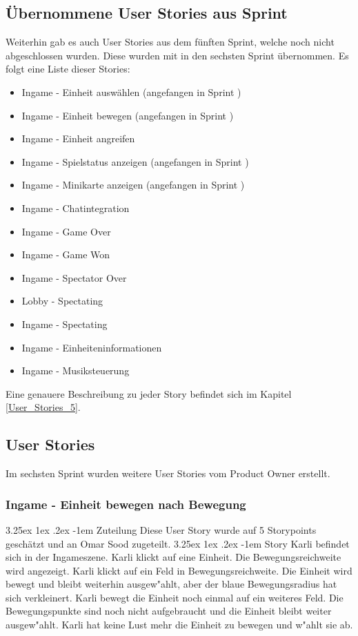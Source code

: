 \documentclass[12pt, titlepage]{scrartcl}
\makeatletter
\newcommand{\RN}[1]{%
	\textup{\uppercase\expandafter{\romannumeral#1}}%
}
\renewcommand\paragraph{\@startsection{paragraph}{5}{\z@}%
  {3.25ex \@plus1ex \@minus.2ex}%
  {-1em}%
  {\normalfont\normalsize\bfseries}}
\makeatother
\begin{document}
   		\subsection{\"Ubernommene User Stories aus Sprint \RN{5}}
   			Weiterhin gab es auch User Stories aus dem f\"unften Sprint, welche noch nicht abgeschlossen wurden. Diese wurden mit in den sechsten Sprint \"ubernommen. Es folgt eine Liste dieser Stories:
   			\begin{itemize}
   				\item Ingame - Einheit ausw\"ahlen (angefangen in Sprint \RN{5})
   				\item Ingame - Einheit bewegen (angefangen in Sprint \RN{5})
   				\item Ingame - Einheit angreifen
   				\item Ingame - Spielstatus anzeigen (angefangen in Sprint \RN{5})
   				\item Ingame - Minikarte anzeigen (angefangen in Sprint \RN{5})
   				\item Ingame - Chatintegration
   				\item Ingame - Game Over
   				\item Ingame - Game Won
   				\item Ingame - Spectator Over
   				\item Lobby - Spectating
   				\item Ingame - Spectating
   				\item Ingame - Einheiteninformationen
   				\item Ingame - Musiksteuerung
   			\end{itemize}
   			Eine genauere Beschreibung zu jeder Story befindet sich im Kapitel \ref{User_Stories_5}.
   		\subsection{User Stories}
   			Im sechsten Sprint wurden weitere User Stories vom Product Owner erstellt.
   			\subsubsection{Ingame - Einheit bewegen nach Bewegung}
   				\paragraph{Zuteilung}
   					Diese User Story wurde auf 5 Storypoints gesch\"atzt und an Omar Sood zugeteilt.
  				\paragraph{Story}
  					Karli befindet sich in der Ingameszene. Karli klickt auf eine Einheit. Die Bewegungsreichweite wird angezeigt. Karli klickt auf ein Feld in Bewegungsreichweite. Die Einheit wird bewegt und bleibt weiterhin ausgew"ahlt, aber der blaue Bewegungsradius hat sich verkleinert. Karli bewegt die Einheit noch einmal auf ein weiteres Feld. Die Bewegungspunkte sind noch nicht aufgebraucht und die Einheit bleibt weiter ausgew"ahlt. Karli hat keine Lust mehr die Einheit zu bewegen und w"ahlt sie ab.
\end{document}
